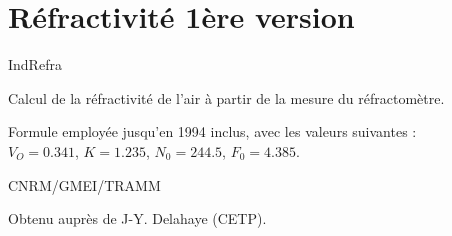 %
\section{R\'efractivit\'e 1\`ere version}

 {\sf IndRefra}

Calcul de la r\'efractivit\'e de l'air \`a 
partir de la mesure du r\'efractom\`etre.

\bigskip






Formule employ\'ee jusqu'en 1994 inclus, avec les valeurs suivantes :\\
$V_O = 0.341$, $K=1.235$, $N_0= 244.5$, $F_0=4.385$.


CNRM/GMEI/TRAMM


Obtenu aupr\`es de J-Y. Delahaye (CETP).
